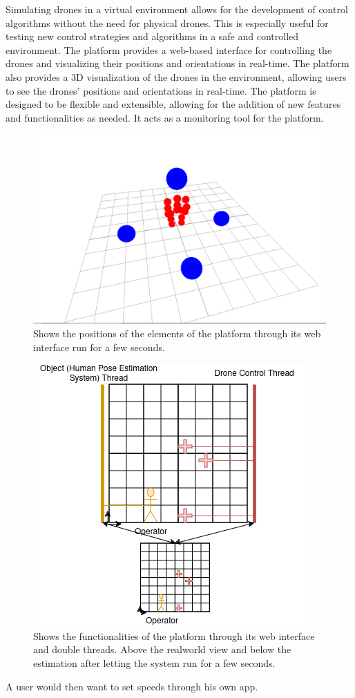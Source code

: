 Simulating drones in a virtual environment allows for the development of control algorithms without the need for physical drones. This is especially useful for testing new control strategies and algorithms in a safe and controlled environment. The platform provides a web-based interface for controlling the drones and visualizing their positions and orientations in real-time. The platform also provides a \gls{3D} visualization of the drones in the environment, allowing users to see the drones' positions and orientations in real-time. The platform is designed to be flexible and extensible, allowing for the addition of new features and functionalities as needed.
It acts as a monitoring tool for the platform. 
\begin{figure}[htbp]
    \centerline{\includegraphics{images/image.png}}
    \caption{Shows the positions  of the elements of the platform through its web interface run for a few seconds.}
    \label{fig}
    \end{figure}

\begin{figure}[htbp]
    \centerline{\includegraphics{images/ComboClient.png}}
    \caption{Shows the functionalities of the platform through its web interface and double threads. Above the realworld view and below the estimation after letting the system run for a few seconds.}
    \label{fig}
    \end{figure}
A user would then want to set speeds through his own app.
